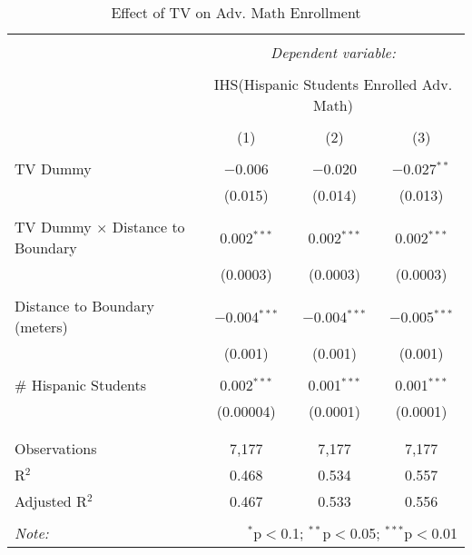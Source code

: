 
\begin{table}[!htbp] \centering 
  \caption{Effect of TV on Adv. Math Enrollment} 
  \label{} 
\begin{tabular}{@{\extracolsep{-2pt}}lccc} 
\\[-1.8ex]\hline 
\hline \\[-1.8ex] 
 & \multicolumn{3}{c}{\textit{Dependent variable:}} \\ 
\cline{2-4} 
\\[-1.8ex] & \multicolumn{3}{c}{IHS(Hispanic Students Enrolled Adv. Math)} \\ 
\\[-1.8ex] & (1) & (2) & (3)\\ 
\hline \\[-1.8ex] 
 TV Dummy & $-$0.006 & $-$0.020 & $-$0.027$^{**}$ \\ 
  & (0.015) & (0.014) & (0.013) \\ 
  & & & \\ 
 TV Dummy $\times$ Distance to Boundary & 0.002$^{***}$ & 0.002$^{***}$ & 0.002$^{***}$ \\ 
  & (0.0003) & (0.0003) & (0.0003) \\ 
  & & & \\ 
 Distance to Boundary (meters) & $-$0.004$^{***}$ & $-$0.004$^{***}$ & $-$0.005$^{***}$ \\ 
  & (0.001) & (0.001) & (0.001) \\ 
  & & & \\ 
 \# Hispanic Students & 0.002$^{***}$ & 0.001$^{***}$ & 0.001$^{***}$ \\ 
  & (0.00004) & (0.0001) & (0.0001) \\ 
  & & & \\ 
\hline \\[-1.8ex] 
Observations & 7,177 & 7,177 & 7,177 \\ 
R$^{2}$ & 0.468 & 0.534 & 0.557 \\ 
Adjusted R$^{2}$ & 0.467 & 0.533 & 0.556 \\ 
\hline 
\hline \\[-1.8ex] 
\textit{Note:}  & \multicolumn{3}{r}{$^{*}$p$<$0.1; $^{**}$p$<$0.05; $^{***}$p$<$0.01} \\ 
\end{tabular} 
\end{table} 
